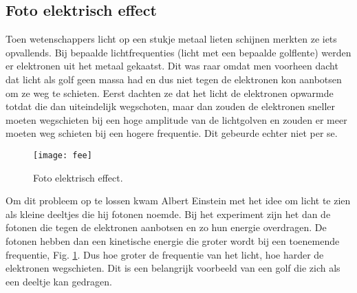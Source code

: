 \documentclass[11pt,fleqn]{book} %
\begin{document}
\subsection{Foto elektrisch effect}
Toen wetenschappers licht op een stukje metaal lieten schijnen merkten ze iets opvallends. Bij bepaalde lichtfrequenties (licht met een bepaalde golflente) werden er elektronen uit het metaal gekaatst. Dit was raar omdat men voorheen dacht dat licht als golf geen massa had en dus niet tegen de elektronen kon aanbotsen om ze weg te schieten. Eerst dachten ze dat het licht de elektronen opwarmde totdat die dan uiteindelijk wegschoten, maar dan zouden de elektronen sneller moeten wegschieten bij een hoge amplitude van de lichtgolven en zouden er meer moeten weg  schieten bij een hogere frequentie. Dit gebeurde echter niet per se. 
\begin{figure}[h]
	\centering\texttt{[image: fee]}
	\caption{Foto elektrisch effect.}
	\label{fig:fee}
\end{figure}
Om dit probleem op te lossen kwam Albert Einstein met het idee om licht te zien als kleine deeltjes die hij fotonen noemde. Bij het experiment zijn het dan de fotonen die tegen de elektronen aanbotsen en zo hun energie overdragen. De fotonen hebben dan een kinetische energie die groter wordt bij een toenemende frequentie, Fig. \ref{fig:fee}. Dus hoe groter de frequentie van het licht, hoe harder de elektronen wegschieten. Dit is een belangrijk voorbeeld van een golf die zich als een deeltje kan gedragen.
\end{document}
